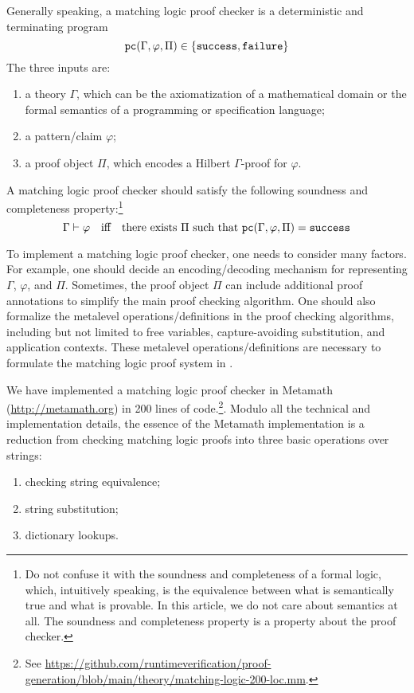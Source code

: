 \documentclass{article}
\begin{document}
Generally speaking,
a matching logic proof checker is a deterministic and terminating program
\begin{equation}
\textnormal{\texttt{pc}}(\Gamma, \varphi, \Pi) \in \{\textnormal{\texttt{success}}, \textnormal{\texttt{failure}}\}
\end{equation}
The three inputs are:
\begin{enumerate}
\item a theory $\Gamma$, which can be the axiomatization of a mathematical domain or the formal semantics of a programming or specification language;
\item a pattern/claim $\varphi$;
\item a proof object $\Pi$,
      which encodes a Hilbert $\Gamma$-proof for $\varphi$.
\end{enumerate}
A matching logic proof checker should satisfy the following
soundness and completeness property:\footnote{Do not confuse it
with the soundness and completeness of a formal logic, which, intuitively speaking,
is the equivalence between what is semantically true and what is provable. In this article, we do not care about semantics at all. The soundness and completeness property is a property about the proof checker.}
\begin{equation}
\label{eq:pc_sound_complete}
\Gamma \vdash \varphi
\quad\text{iff}\quad
\text{there exists $\Pi$ such that $\textnormal{\texttt{pc}}(\Gamma, \varphi, \Pi) = \textnormal{\texttt{success}}$}
\end{equation}

To implement a matching logic proof checker,
one needs to consider many factors.
For example, one should decide an encoding/decoding mechanism for
representing $\Gamma$, $\varphi$, and $\Pi$.
Sometimes, the proof object $\Pi$ can include additional
proof annotations to simplify the main proof checking algorithm.
One should also formalize the metalevel operations/definitions
in the proof checking algorithms, including but not limited to
free variables, capture-avoiding substitution, and application contexts.
These metalevel operations/definitions are necessary to formulate the
matching logic proof system in .

We have implemented a matching logic proof checker in Metamath
(\url{http://metamath.org})
in 200 lines of code.\footnote{See \url{https://github.com/runtimeverification/proof-generation/blob/main/theory/matching-logic-200-loc.mm}.}.
Modulo all the technical and implementation details,
the essence of the Metamath implementation is a reduction
from checking matching logic proofs into three basic operations
over strings:
\begin{enumerate}
\item checking string equivalence;
\item string substitution;
\item dictionary lookups.
\end{enumerate}
\end{document}
